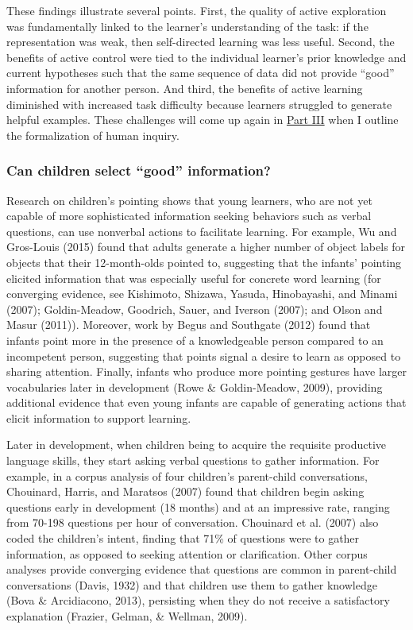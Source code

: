 \documentclass[english,floatsintext,man]{apa6}
\theoremstyle{definition}
\theoremstyle{definition}
\theoremstyle{definition}
\theoremstyle{remark}
\begin{document}
These findings illustrate several points. First, the quality of active
exploration was fundamentally linked to the learner's understanding of
the task: if the representation was weak, then self-directed learning
was less useful. Second, the benefits of active control were tied to the
individual learner's prior knowledge and current hypotheses such that
the same sequence of data did not provide \enquote{good} information for
another person. And third, the benefits of active learning diminished
with increased task difficulty because learners struggled to generate
helpful examples. These challenges will come up again in
\protect\hyperlink{p3}{Part III} when I outline the formalization of
human inquiry.

\subsubsection{\texorpdfstring{Can children select \enquote{good}
information?}{Can children select good information?}}\label{can-children-select-good-information}

Research on children's pointing shows that young learners, who are not
yet capable of more sophisticated information seeking behaviors such as
verbal questions, can use nonverbal actions to facilitate learning. For
example, Wu and Gros-Louis (2015) found that adults generate a higher
number of object labels for objects that their 12-month-olds pointed to,
suggesting that the infants' pointing elicited information that was
especially useful for concrete word learning (for converging evidence,
see Kishimoto, Shizawa, Yasuda, Hinobayashi, and Minami (2007);
Goldin-Meadow, Goodrich, Sauer, and Iverson (2007); and Olson and Masur
(2011)). Moreover, work by Begus and Southgate (2012) found that infants
point more in the presence of a knowledgeable person compared to an
incompetent person, suggesting that points signal a desire to learn as
opposed to sharing attention. Finally, infants who produce more pointing
gestures have larger vocabularies later in development (Rowe \&
Goldin-Meadow, 2009), providing additional evidence that even young
infants are capable of generating actions that elicit information to
support learning.

Later in development, when children being to acquire the requisite
productive language skills, they start asking verbal questions to gather
information. For example, in a corpus analysis of four children's
parent-child conversations, Chouinard, Harris, and Maratsos (2007) found
that children begin asking questions early in development (18 months)
and at an impressive rate, ranging from 70-198 questions per hour of
conversation. Chouinard et al. (2007) also coded the children's intent,
finding that 71\% of questions were to gather information, as opposed to
seeking attention or clarification. Other corpus analyses provide
converging evidence that questions are common in parent-child
conversations (Davis, 1932) and that children use them to gather
knowledge (Bova \& Arcidiacono, 2013), persisting when they do not
receive a satisfactory explanation (Frazier, Gelman, \& Wellman, 2009).
\end{document}
